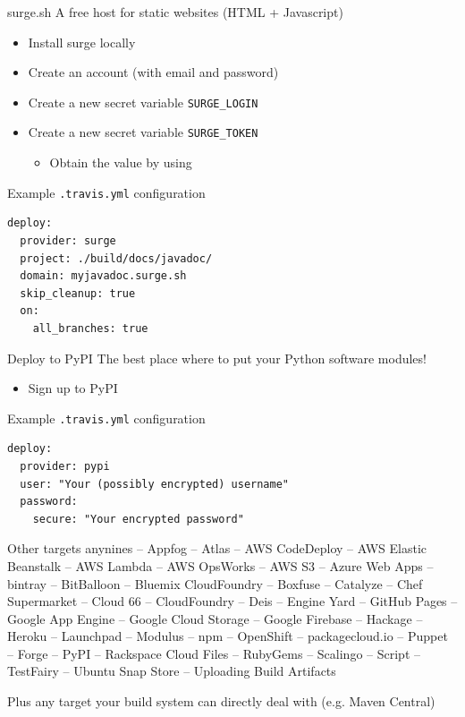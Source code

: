 \documentclass[presentation]{beamer}
\begin{document}
\begin{frame}[fragile]{surge.sh}
    A free host for static websites (HTML + Javascript)
    \begin{itemize}
        \item Install surge locally
        \item Create an account (with email and password)
        \item Create a new secret variable \texttt{SURGE\_LOGIN}
        \item Create a new secret variable \texttt{SURGE\_TOKEN}
        \begin{itemize}
            \item Obtain the value by using 
        \end{itemize}
    \end{itemize}
    \begin{block}{Example \texttt{.travis.yml} configuration}
        \begin{verbatim}
deploy:
  provider: surge
  project: ./build/docs/javadoc/
  domain: myjavadoc.surge.sh
  skip_cleanup: true
  on:
    all_branches: true
        \end{verbatim}
    \end{block}
\end{frame}

\begin{frame}[fragile]{Deploy to PyPI}
    The best place where to put your Python software modules!
    \begin{itemize}
        \item Sign up to PyPI
    \end{itemize}
    \begin{block}{Example \texttt{.travis.yml} configuration}
        \begin{verbatim}
deploy:
  provider: pypi
  user: "Your (possibly encrypted) username"
  password:
    secure: "Your encrypted password"
        \end{verbatim}
    \end{block}
\end{frame}

\begin{frame}{Other targets}
anynines -- Appfog -- Atlas -- AWS CodeDeploy -- AWS Elastic Beanstalk -- AWS Lambda -- AWS OpsWorks -- AWS S3 -- Azure Web Apps -- bintray -- BitBalloon -- Bluemix CloudFoundry -- Boxfuse -- Catalyze -- Chef Supermarket -- Cloud 66 -- CloudFoundry -- Deis -- Engine Yard -- GitHub Pages -- Google App Engine -- Google Cloud Storage -- Google Firebase -- Hackage -- Heroku -- Launchpad -- Modulus -- npm -- OpenShift -- packagecloud.io -- Puppet -- Forge -- PyPI -- Rackspace Cloud Files -- RubyGems -- Scalingo -- Script -- TestFairy -- Ubuntu Snap Store -- Uploading Build Artifacts

\vspace{10pt}

Plus any target your build system can directly deal with (e.g. Maven Central)
\end{frame}
\end{document}
